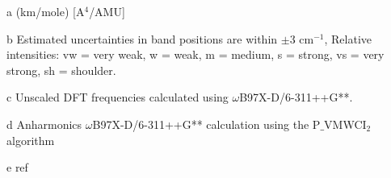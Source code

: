 \begin{table}[H]
\begin{center}
\begin{threeparttable}
			\begin{tablenotes}
				\item[a] (km/mole) [A$^{4}$/AMU]
				\item[b] Estimated uncertainties in band positions are within $\pm$3 cm$^{-1}$, Relative intensities: vw = very weak, w = weak, m = medium, s = strong, vs = very strong, sh = shoulder.
				\item[c] Unscaled DFT frequencies calculated using $\omega$B97X-D/6-311++G**.
				\item[d] Anharmonics $\omega$B97X-D/6-311++G** calculation using the P$\_$VMWCI$_{2}$ algorithm\item[e] ref
			\end{tablenotes}
		\end{threeparttable}
	\end{center}
		\label{lowfreq-Indole}
	\end{table}
	
	
	
